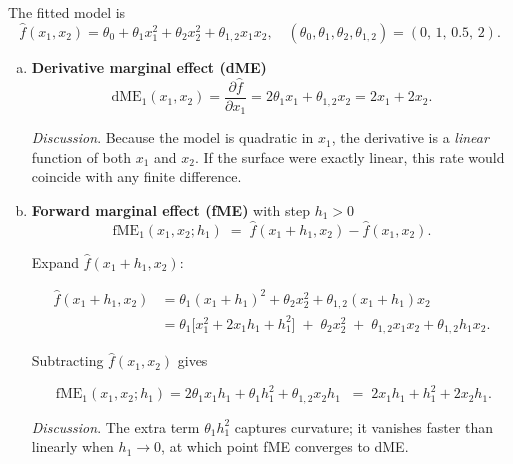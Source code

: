 \loesung
{

\vspace{0.5em}
The fitted model is
\[
  \hat{f}(x_1,x_2)=\theta_0+\theta_1 x_1^{2}+\theta_2 x_2^{2}+ \theta_{1,2}x_1x_2,
  \quad
  (\theta_0,\theta_1,\theta_2,\theta_{1,2})=(0,\,1,\,0.5,\,2).
\]

\begin{enumerate}[a)]
\item \textbf{Derivative marginal effect (dME)}\\[0.1em]
\[
  \text{dME}_1(x_1,x_2)=
  \frac{\partial\hat f}{\partial x_1}
  =2\theta_1x_1+\theta_{1,2}x_2
  =2x_1+2x_2.
\]

\emph{Discussion}.  
Because the model is quadratic in \(x_1\), the derivative is a \emph{linear}
function of both \(x_1\) and \(x_2\).  
If the surface were exactly linear, this rate would coincide with any finite
difference.

\item \textbf{Forward marginal effect (fME)} with step \(h_1>0\)\\[0.1em]

\[
  \text{fME}_1(x_1,x_2;h_1) \;=\;
  \hat f(x_1+h_1,x_2)-\hat f(x_1,x_2).
\]

Expand \(\hat f(x_1+h_1,x_2)\):

\begin{align*}
  \hat f(x_1\!+\!h_1,x_2)
  &=\theta_1(x_1+h_1)^2+\theta_2x_2^2+\theta_{1,2}(x_1+h_1)x_2 \\
  &=\theta_1\bigl[x_1^2+2x_1h_1+h_1^2\bigr]
    \;+\;\theta_2x_2^2
    \;+\;\theta_{1,2}x_1x_2+\theta_{1,2}h_1x_2.
\end{align*}

Subtracting \(\hat f(x_1,x_2)\) gives

\[
  \boxed{\;
  \text{fME}_1(x_1,x_2;h_1)=
  2\theta_1x_1h_1+\theta_1h_1^{2}+\theta_{1,2}x_2h_1
  \;}
  \;=\;
  2x_1h_1+h_1^{2}+2x_2h_1 .
\]

\emph{Discussion}.  
The extra term \(\theta_1h_1^{2}\) captures curvature; it vanishes faster than linearly when \(h_1\to0\), at which point fME converges to dME.



\end{enumerate}}

